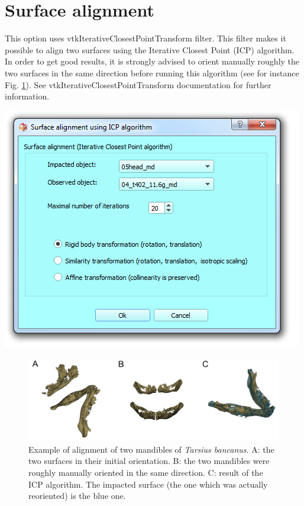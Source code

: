 \section{Surface alignment}
\noindent
\begin{minipage}{0.5\textwidth}
This option uses vtkIterativeClosestPointTransform filter. This filter makes it possible to align two surfaces using the Iterative Closest Point (ICP) algorithm. In order to get good results, it is strongly advised to orient manually roughly the two surfaces in the same direction before running this algorithm 
(see for instance Fig. \ref{surface_alignment}). See vtkIterativeClosestPointTransform documentation for further information.



\end{minipage}    
\begin{minipage}{0.5\textwidth}\centering
  \includegraphics[scale=0.5]{images/09/alignment/surface_alignment_dialog.png}
 \end{minipage} 

\begin{figure}
  \centering
  \includegraphics[scale=0.21]{images/09/alignment/surface_alignment.png} 
	\caption{Example of alignment of two mandibles of \textit{Tarsius bancanus}. A: the two surfaces in their initial orientation. B: the two mandibles were roughly manually oriented in the same direction. C: result of the ICP algorithm. The impacted surface (the one which was actually reoriented) is the blue one. }
 \label{surface_alignment}
\end{figure}



